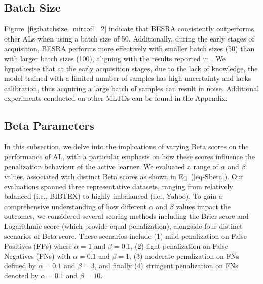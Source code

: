 \documentclass[letterpaper]{article} %
\begin{document}
\subsection{Batch Size}
Figure~\ref{fig:batchsize_mircof1_2} indicate that BESRA consistently outperforms other ALs when using a batch size of 50.
Additionally, during the early stages of acquisition, BESRA performs more effectively with smaller batch sizes (50) than with larger batch sizes (100), aligning with the results reported in \cite{TanDuBun-IEEEPAMI23, NEURIPS2019_95323660}.
We hypothesise that at the early acquisition stages, due to the lack of knowledge, the model trained with a limited number of samples has high uncertainty and lacks calibration, thus acquiring a large batch of samples can result in noise. Additional experiments conducted on other MLTDs can be found in the Appendix.


\subsection{Beta Parameters}

In this subsection, we delve into the implications of varying Beta scores on the performance of AL, with a particular emphasis on how these scores influence the penalization behaviour of the active learner.
We evaluated a range of $\alpha$ and $\beta$ values, associated with distinct Beta scores as shown in Eq~(\ref{eq-Sbeta}).
Our evaluations spanned three representative datasets, ranging from relatively balanced (i.e., BIBTEX) to highly imbalanced (i.e., Yahoo). To gain a comprehensive understanding of how different $\alpha$ and $\beta$ values impact the outcomes, we considered several scoring methods including the Brier score and Logarithmic score (which provide equal penalization), alongside four distinct scenarios of Beta score. These scenarios include (1) mild penalization on False Positives (FPs) where $\alpha=1$ and $\beta=0.1$, (2) light penalization on False Negatives (FNs) with $\alpha=0.1$ and $\beta=1$, (3) moderate penalization on FNs defined by $\alpha=0.1$ and $\beta=3$, and finally (4) stringent penalization on FNs denoted by $\alpha=0.1$ and $\beta=10$.
\end{document}
